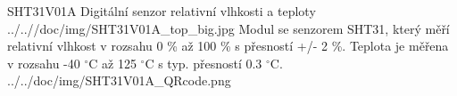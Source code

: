 \uvod
{SHT31V01A}
{Digitální senzor relativní vlhkosti a teploty}
{}
{../..//doc/img/SHT31V01A_top_big.jpg}
{Modul se senzorem SHT31, který měří relativní vlhkost v rozsahu 0 \% až 100 \% s přesností +/- 2 \%. Teplota je měřena v rozsahu -40 $^\circ$C až 125 $^\circ$C s typ. přesností 0.3 $^\circ$C.}
{ }
{../../doc/img/SHT31V01A_QRcode.png}